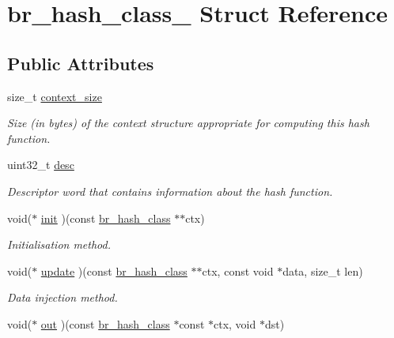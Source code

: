 \hypertarget{structbr__hash__class__}{}\section{br\+\_\+hash\+\_\+class\+\_\+ Struct Reference}
\label{structbr__hash__class__}
\subsection*{Public Attributes}
\begin{DoxyCompactItemize}
\item 
\mbox{\label{structbr__hash__class___a53b629c36645dd703da6ccefa245a78d}} 
size\+\_\+t \hyperlink{structbr__hash__class___a53b629c36645dd703da6ccefa245a78d}{context\+\_\+size}
\begin{DoxyCompactList}\small\item\em Size (in bytes) of the context structure appropriate for computing this hash function. \end{DoxyCompactList}\item 
uint32\+\_\+t \hyperlink{structbr__hash__class___a83ce0b40ed9d8de4cdfde6391c7d8728}{desc}
\begin{DoxyCompactList}\small\item\em Descriptor word that contains information about the hash function. \end{DoxyCompactList}\item 
void($\ast$ \hyperlink{structbr__hash__class___a576d5f1abbd1bb61a8686e0ff0f0d2ff}{init} )(const \hyperlink{bearssl__hash_8h_ae38c1b9d539537cc16fc84388b922d86}{br\+\_\+hash\+\_\+class} $\ast$$\ast$ctx)
\begin{DoxyCompactList}\small\item\em Initialisation method. \end{DoxyCompactList}\item 
void($\ast$ \hyperlink{structbr__hash__class___a5f8725811995c5064c87939c1957547e}{update} )(const \hyperlink{bearssl__hash_8h_ae38c1b9d539537cc16fc84388b922d86}{br\+\_\+hash\+\_\+class} $\ast$$\ast$ctx, const void $\ast$data, size\+\_\+t len)
\begin{DoxyCompactList}\small\item\em Data injection method. \end{DoxyCompactList}\item 
void($\ast$ \hyperlink{structbr__hash__class___a8a200645aa525939cb33d6c448c24e65}{out} )(const \hyperlink{bearssl__hash_8h_ae38c1b9d539537cc16fc84388b922d86}{br\+\_\+hash\+\_\+class} $\ast$const $\ast$ctx, void $\ast$dst)

\end{DoxyCompactItemize}

